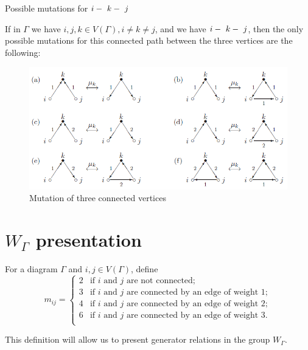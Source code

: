 \documentclass{beamer}
\begin{document}
\begin{frame}{Possible mutations for $i\--\ k\--\ j$}
\begin{corollary}
If in $\Gamma$ we have $i,j,k \in V(\Gamma), i \neq k \neq j$, and we have $i\--\ k\--\ j$, then the only possible mutations for this connected path between the three vertices are the following:
\begin{figure}[h]
\centering
\includegraphics[scale = .40]{mutation3path.PNG}
\caption{Mutation of three connected vertices}
\end{figure}
\end{corollary}
\end{frame}




\section{$W_{\Gamma}$  presentation}

\begin{frame}
\begin{definition}
For a diagram $\Gamma$ and $i, j \in V(\Gamma)$, define 
\begin{displaymath}
m_{ij} = \begin{cases}    2 & \mbox{if } i \mbox{ and } j \mbox{ are not connected;} \\
																	3 & \mbox{if } i \mbox{ and } j \mbox{ are connected by an edge of weight } 1;\\
																	4 & \mbox{if } i \mbox{ and } j \mbox{ are connected by an edge of weight } 2;\\
																	6 & \mbox{if } i \mbox{ and } j \mbox{ are connected by an edge of weight } 3.\\
					\end{cases}
\end{displaymath}	
\end{definition}

This definition will allow us to present generator relations in the group $W_{\Gamma}$.
\end{frame}
\end{document}
